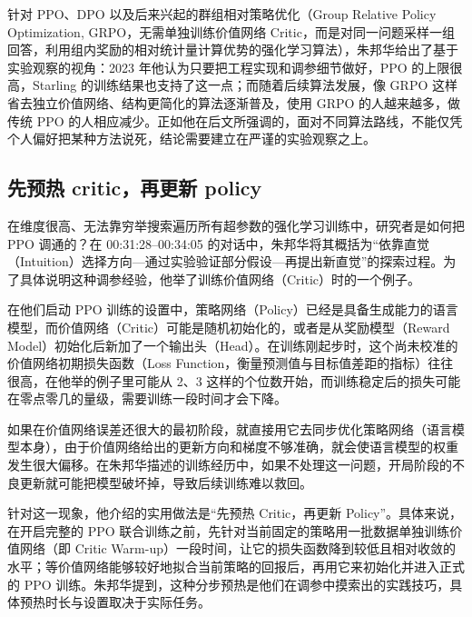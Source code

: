 \documentclass[UTF8,a4paper,11pt,fontset=fandol]{ctexart}
\begin{document}
针对 PPO、DPO 以及后来兴起的群组相对策略优化（Group Relative Policy Optimization, GRPO，无需单独训练价值网络 Critic，而是对同一问题采样一组回答，利用组内奖励的相对统计量计算优势的强化学习算法），朱邦华给出了基于实验观察的视角：2023 年他认为只要把工程实现和调参细节做好，PPO 的上限很高，Starling 的训练结果也支持了这一点；而随着后续算法发展，像 GRPO 这样省去独立价值网络、结构更简化的算法逐渐普及，使用 GRPO 的人越来越多，做传统 PPO 的人相应减少。正如他在后文所强调的，面对不同算法路线，不能仅凭个人偏好把某种方法说死，结论需要建立在严谨的实验观察之上。

\subsection{先预热 critic，再更新 policy}
在维度很高、无法靠穷举搜索遍历所有超参数的强化学习训练中，研究者是如何把 PPO 调通的？在 00:31:28–00:34:05 的对话中，朱邦华将其概括为“依靠直觉（Intuition）选择方向—通过实验验证部分假设—再提出新直觉”的探索过程。为了具体说明这种调参经验，他举了训练价值网络（Critic）时的一个例子。

在他们启动 PPO 训练的设置中，策略网络（Policy）已经是具备生成能力的语言模型，而价值网络（Critic）可能是随机初始化的，或者是从奖励模型（Reward Model）初始化后新加了一个输出头（Head）。在训练刚起步时，这个尚未校准的价值网络初期损失函数（Loss Function，衡量预测值与目标值差距的指标）往往很高，在他举的例子里可能从 2、3 这样的个位数开始，而训练稳定后的损失可能在零点零几的量级，需要训练一段时间才会下降。

如果在价值网络误差还很大的最初阶段，就直接用它去同步优化策略网络（语言模型本身），由于价值网络给出的更新方向和梯度不够准确，就会使语言模型的权重发生很大偏移。在朱邦华描述的训练经历中，如果不处理这一问题，开局阶段的不良更新就可能把模型破坏掉，导致后续训练难以救回。

针对这一现象，他介绍的实用做法是“先预热 Critic，再更新 Policy”。具体来说，在开启完整的 PPO 联合训练之前，先针对当前固定的策略用一批数据单独训练价值网络（即 Critic Warm-up）一段时间，让它的损失函数降到较低且相对收敛的水平；等价值网络能够较好地拟合当前策略的回报后，再用它来初始化并进入正式的 PPO 训练。朱邦华提到，这种分步预热是他们在调参中摸索出的实践技巧，具体预热时长与设置取决于实际任务。
\end{document}
